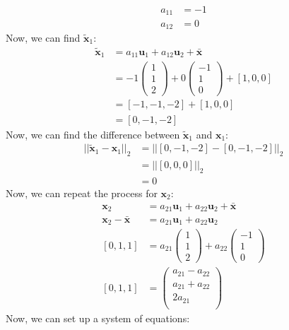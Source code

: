\documentclass[a3paper,12pt]{extarticle} %
\begin{document}
\begin{enumerate}
\begin{align}
a_{11} &= -1\\
a_{12} &= 0
\end{align}
Now, we can find $\tilde{\mathbf{x}}_1$:
\begin{align}
\tilde{\mathbf{x}}_1 &= a_{11}\mathbf{u}_1 + a_{12}\mathbf{u}_2 + \bar{\mathbf{x}}\\
&= -1\begin{pmatrix}
1\\
1\\
2
\end{pmatrix} + 0\begin{pmatrix}
-1\\
1\\
0
\end{pmatrix} + [1, 0, 0]\\
&= [-1, -1, -2] + [1, 0, 0]\\
&= [0, -1, -2]
\end{align}
Now, we can find the difference between $\tilde{\mathbf{x}}_1$ and $\mathbf{x}_1$:
\begin{align}
||\tilde{\mathbf{x}}_1 - \mathbf{x}_1||_2 &= ||[0, -1, -2] - [0, -1, -2]||_2\\
&= ||[0, 0, 0]||_2\\
&= 0
\end{align}
Now, we can repeat the process for $\mathbf{x}_2$:
\begin{align}
\mathbf{x}_2 &= a_{21}\mathbf{u}_1 + a_{22}\mathbf{u}_2 + \bar{\mathbf{x}}\\
\mathbf{x}_2 - \bar{\mathbf{x}} &= a_{21}\mathbf{u}_1 + a_{22}\mathbf{u}_2\\
[0, 1, 1] &= a_{21}\begin{pmatrix}
1\\
1\\
2
\end{pmatrix} + a_{22}\begin{pmatrix}
-1\\
1\\
0
\end{pmatrix}\\
[0, 1, 1] &= \begin{pmatrix}
a_{21} - a_{22}\\
a_{21} + a_{22}\\
2a_{21}\\
\end{pmatrix}
\end{align}
Now, we can set up a system of equations:
\begin{align}

\end{align}
\end{enumerate}
\end{document}
